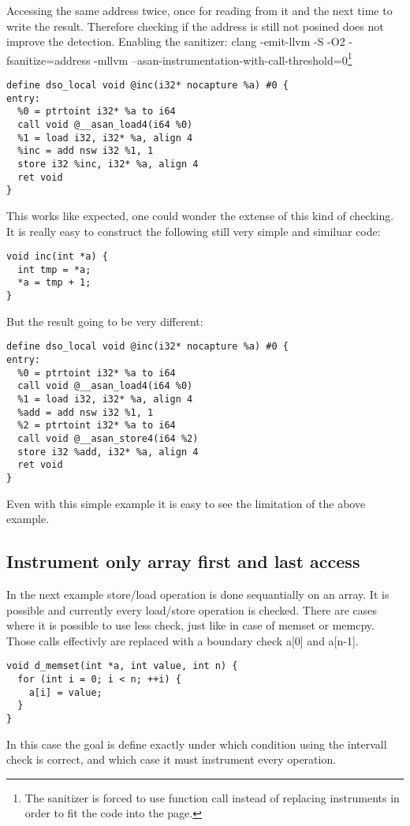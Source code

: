 \documentclass[letterpaper, 10 pt, conference]{llncs}  %
\begin{document}
Accessing the same address twice, once for reading from it and the next time to write the result. Therefore checking if the address is still not posined does not improve the detection. 
Enabling the sanitizer: clang -emit-llvm -S -O2 -fsanitize=address -mllvm --asan-instrumentation-with-call-threshold=0\footnote{The sanitizer is forced to use function call instead of replacing instruments in order to fit the code into the page.}

\begin{verbatim}
define dso_local void @inc(i32* nocapture %a) #0 {
entry:
  %0 = ptrtoint i32* %a to i64
  call void @__asan_load4(i64 %0)
  %1 = load i32, i32* %a, align 4
  %inc = add nsw i32 %1, 1
  store i32 %inc, i32* %a, align 4
  ret void
}
\end{verbatim}

This works like expected, one could wonder the extense of this kind of checking. It is really easy to construct the following still very simple and similuar code:

\begin{verbatim}
void inc(int *a) {
  int tmp = *a;
  *a = tmp + 1;
}
\end{verbatim}

But the result going to be very different:

\begin{verbatim}
define dso_local void @inc(i32* nocapture %a) #0 {
entry:
  %0 = ptrtoint i32* %a to i64
  call void @__asan_load4(i64 %0)
  %1 = load i32, i32* %a, align 4
  %add = add nsw i32 %1, 1
  %2 = ptrtoint i32* %a to i64
  call void @__asan_store4(i64 %2)
  store i32 %add, i32* %a, align 4
  ret void
}
\end{verbatim}

Even with this simple example it is easy to see the limitation of the above example.

\subsection{Instrument only array first and last access}

In the next example store/load operation is done sequantially on an array. It is possible and currently every load/store operation is checked. There are cases where it is possible to use less check, just like in case of memset or memcpy. Those calls effectivly are replaced with a boundary check a[0] and a[n-1].
\begin{verbatim}
void d_memset(int *a, int value, int n) {
  for (int i = 0; i < n; ++i) {
    a[i] = value;
  }
}
\end{verbatim}
In this case the goal is define exactly under which condition using the intervall check is correct, and which case it must instrument every operation.
\end{document}
